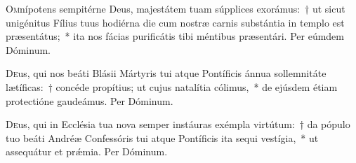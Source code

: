\documentclass[vesperale_romanum.tex]{subfiles}
\begin{document}
\lettrine{O}{m}nípotens sempitérne Deus, majestátem tuam súpplices exorámus:~† ut sicut unigénitus Fílius tuus hodiérna die cum nostræ carnis substántia in templo est præsentátus;~* ita nos fácias purificátis tibi méntibus præsentári.
Per eúmdem Dóminum.










\admagnificat




\myrule



\oratio

\lettrine{D}{e}us, qui nos beáti Blásii Mártyris tui atque Pontíficis ánnua sollemnitáte lætíficas:~† concéde propítius; ut cujus natalítia cólimus,~* de ejúsdem étiam prote\-ctióne gaudeámus.
Per Dóminum.

\myrule


\duplexmtv

\oratio

\lettrine{D}{e}us, qui in Ecclésia tua nova semper instáuras exémpla virtútum:~† da pópulo tuo beáti Andréæ Confessóris tui atque Pontíficis ita sequi vestígia,~* ut assequátur et prǽmia. Per Dóminum.
\end{document}
